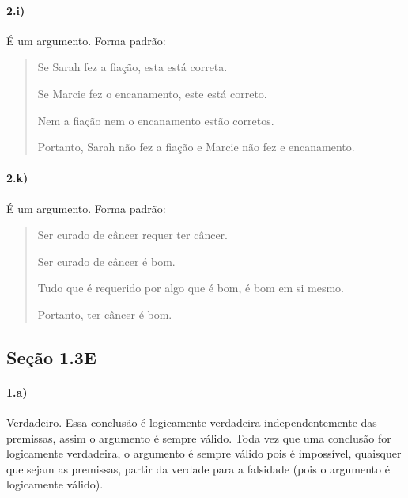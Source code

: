 \documentclass[pdftex,a4paper,12pt,brazil]{article} %
\begin{document}
\paragraph{2.i)} É um argumento. Forma padrão:

\begin{quote}
  Se Sarah fez a fiação, esta está correta.

  Se Marcie fez o encanamento, este está correto.

  Nem a fiação nem o encanamento estão corretos.

  \vspace{-0.5cm}
  \noindent\hrulefill
  
  Portanto, Sarah não fez a fiação e Marcie não fez e encanamento.
\end{quote}

\paragraph{2.k)} É um argumento. Forma padrão:

\begin{quote}
  Ser curado de câncer requer ter câncer.

  Ser curado de câncer é bom.
  
  Tudo que é requerido por algo que é bom, é bom em si mesmo.

  \vspace{-0.5cm}
  \noindent\hrulefill
  
  Portanto, ter câncer é bom.
\end{quote}


\subsection{Seção 1.3E}
\label{tlb-1-13e}

\paragraph{1.a)} Verdadeiro. Essa conclusão é logicamente verdadeira independentemente
das premissas, assim o argumento é sempre válido. Toda vez que uma conclusão for logicamente
verdadeira, o argumento é sempre válido pois é impossível, quaisquer que sejam as premissas,
partir da verdade para a falsidade (pois o argumento é logicamente válido).
\end{document}
